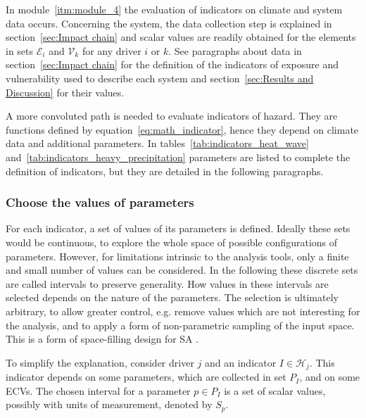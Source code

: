 In module~\ref{itm:module_4} the evaluation of \glspl{indicator} on climate and system data occurs. Concerning the system, the data collection step is explained in section~\ref{sec:Impact chain} and scalar values are readily obtained for the elements in sets $\mathcal{E}_i$ and $\mathcal{V}_k$ for any \gls{driver} $i$ or $k$. See paragraphs about data in section~\ref{sec:Impact chain} for the definition of the \glspl{indicator} of \gls{exposure} and \gls{vulnerability} used to describe each system and section~\ref{sec:Results and Discussion} for their values.

A more convoluted path is needed to evaluate \glspl{indicator} of \gls{hazard}. They are functions defined by equation~\eqref{eq:math_indicator}, hence they depend on climate data and additional parameters. In tables~\ref{tab:indicators_heat_wave} and~\ref{tab:indicators_heavy_precipitation} parameters are listed to complete the definition of indicators, but they are detailed in the following paragraphs.



\subsubsection{Choose the values of parameters}
For each \gls{indicator}, a set of values of its parameters is defined. Ideally these sets would be continuous, to explore the whole space of possible configurations of parameters. However, for limitations intrinsic to the analysis tools, only a finite and small number of values can be considered. In the following these discrete sets are called intervals to preserve generality.
How values in these intervals are selected depends on the nature of the parameters. The selection is ultimately arbitrary, to allow greater control, e.g. remove values which are not interesting for the analysis, and to apply a form of non-parametric sampling of the input space. This is a form of space-filling design for \gls{SA} \cite[593-594]{2015DeanHandbookOf}.

To simplify the explanation, consider \gls{driver} $j$ and an \gls{indicator} $I \in \mathcal{H}_j$. This \gls{indicator} depends on some parameters, which are collected in set $P_I$, and on some \glspl{ECV}. The chosen interval for a parameter $p \in P_I$ is a set of scalar values, possibly with units of measurement, denoted by $S_p$.

